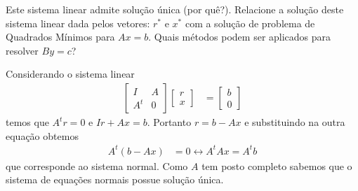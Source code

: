 \documentclass[a4paper,12pt, leqno, answers]{exam}
\begin{document}
\begin{questions}
    Este sistema linear admite solu\c{c}\~{a}o \'{u}nica (por qu\^{e}?). Relacione a solu\c{c}\~{a}o deste sistema linear dada pelos vetores: $r^*$ e $x^*$ com a solu\c{c}\~{a}o de problema de Quadrados M\'{i}nimos para $A x = b$. Quais m\'{e}todos podem ser aplicados para resolver $B y = c$?
    \begin{solution}
        Considerando o sistema linear
        \begin{align*}
            \begin{bmatrix}
                I & A \\
                A^t & 0
            \end{bmatrix} \begin{bmatrix}
                r \\
                x
            \end{bmatrix} &= \begin{bmatrix}
                b \\
                0
            \end{bmatrix}
        \end{align*}
        temos que $A^t r = 0$ e $I r + A x = b$. Portanto $r = b - A x$ e substituindo na outra equa\c{c}\~{a}o obtemos
        \begin{align*}
            A^t \left( b - A x \right) &= 0 \leftrightarrow A^t A x = A^tb
        \end{align*}
        que corresponde ao sistema normal. Como $A$ tem posto completo sabemos que o sistema de equa\c{c}\~{o}es normais possue solu\c{c}\~{a}o \'{u}nica.
    \end{solution}


\end{questions}
\end{document}
